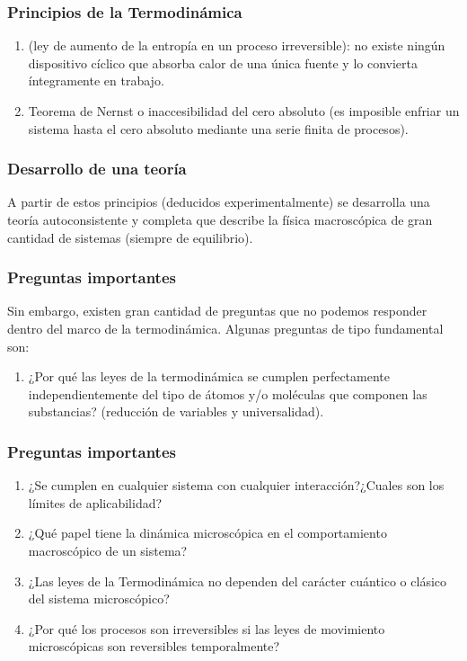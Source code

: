 \documentclass[12pt]{beamer}
\begin{document}
\begin{frame}
\frametitle{Principios de la Termodinámica}
\begin{enumerate}[<+->]
\conti
\item {} (ley de aumento de la entropía en un proceso irreversible): no existe ningún dispositivo cíclico que absorba calor de una única fuente y lo convierta íntegramente en trabajo.
\item {} Teorema de Nernst o inaccesibilidad del cero absoluto (es imposible enfriar un sistema hasta el cero absoluto mediante una serie finita de procesos).
\end{enumerate}
\end{frame}
\begin{frame}
\frametitle{Desarrollo de una teoría}
A partir de estos principios (deducidos experimentalmente) se desarrolla una teoría autoconsistente y completa
que describe la física macroscópica de gran cantidad de sistemas (siempre de equilibrio).
\end{frame}
\begin{frame}
\frametitle{Preguntas importantes}
Sin embargo, existen gran cantidad de preguntas que no podemos responder dentro del marco de la termodinámica. \pause 
Algunas preguntas de tipo fundamental son:
\pause
{}
\begin{enumerate}[<+->]
\item ¿Por qué las leyes de la termodinámica se cumplen perfectamente independientemente del tipo de átomos y/o moléculas que componen las substancias? (reducción de variables y universalidad).
\seti
\end{enumerate}
\end{frame}
\begin{frame}
\frametitle{Preguntas importantes}
\begin{enumerate}[<+->]
\conti
\item ¿Se cumplen en cualquier sistema con cualquier interacción?¿Cuales son los límites de aplicabilidad?
\item ¿Qué papel tiene la dinámica microscópica en el comportamiento macroscópico de un sistema?
\item ¿Las leyes de la Termodinámica no dependen del carácter cuántico o clásico del sistema microscópico?
\item ¿Por qué los procesos son irreversibles si las leyes de movimiento microscópicas son reversibles temporalmente?
\end{enumerate}
\end{frame}
\end{document}
